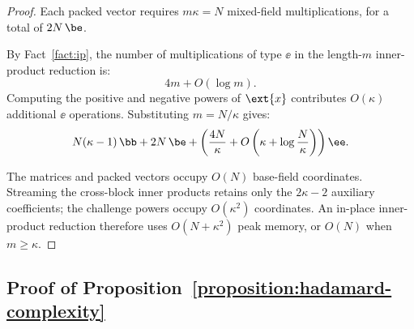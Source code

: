 \begin{proof}
Each packed vector requires \(m\kappa=N\) mixed-field
multiplications, for a total of \(2N\,\be\).

By Fact~\ref{fact:ip}, the number of multiplications of type
\(\ee\) in the length-\(m\) inner-product reduction is:
\[
    4m+O(\log m).
\]
Computing the positive and negative powers of \(\ext{x}\)
contributes \(O(\kappa)\)
additional \(\ee\) operations. Substituting \(m=N/\kappa\) gives:
\[
    N(\kappa-1)\,\bb
    +
    2N\,\be
    +
    \left(
        \frac{4N}{\kappa}
        +
        O\left(
            \kappa+\log\frac{N}{\kappa}
        \right)
    \right)\ee.
\]

The matrices and packed vectors occupy \(O(N)\) base-field
coordinates. Streaming the cross-block inner products retains
only the \(2\kappa-2\) auxiliary coefficients; the challenge
powers occupy \(O(\kappa^2)\) coordinates. An in-place
inner-product reduction therefore uses \(O(N+\kappa^2)\) peak
memory, or \(O(N)\) when \(m\geq\kappa\).
\end{proof}

\subsection{Proof of Proposition~\ref{proposition:hadamard-complexity}}
\label{appx:proof-hadamard}

